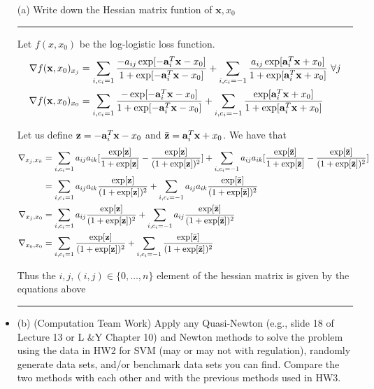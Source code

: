 \documentclass{article} %
\newcommand{\B}[1]{\mathbf{#1}}
\renewcommand\a{{\bf a}}
\newcommand\z{{\bf z}}
\newcommand\x{{\bf x}}
\renewcommand\a{{\bf a}}
\begin{document}
\begin{itemize}

\item[(a)]
Write down the Hessian matrix funtion of $\B{x}, x_0$


\rule{\textwidth}{1pt}

Let $f(x,x_0)$ be the log-logistic loss function. 
\begin{equation*}
\begin{aligned}
\nabla f(\x,x_0)_{x_j} &= \sum_{i,c_i = 1} \frac{-a_{ij} \exp[ -\a_i^T \x - x_0 ]}{ 1 + \exp[ -\a_i^T \x - x_0 ]} + \sum_{i, c_i = -1} \frac{a_{ij} \exp[ \a_i^T \x + x_0 ]}{ 1 + \exp[ \a_i^T \x + x_0 ]}  \mbox{  } \forall j \\
\nabla f(\x,x_0)_{x_0} &= \sum_{i,c_i = 1} \frac{- \exp[ -\a_i^T \x - x_0 ]}{ 1 + \exp[ -\a_i^T \x - x_0 ]} + \sum_{i, c_i = -1} \frac{ \exp[ \a_i^T \x + x_0 ]}{ 1 + \exp[ \a_i^T \x + x_0 ]} \\  
\end{aligned}
\end{equation*}


Let us define $\z = -\a_i^T \x - x_0 $ and $\bar{\z} =  \a_i^T \x + x_0$. We have that 
\begin{equation*}
\begin{aligned}
\nabla_{x_j, x_k} &= \sum_{i, c_i=1} a_{ij} a_{ik} [\frac{\exp[\z]}{ 1+ \exp[\z]}  - \frac{ \exp[\z]}{(1 + \exp[\z])^2}] + \sum_{i, c_i = -1} a_{ij} a_{ik} [\frac{\exp[\bar{\z}]}{ 1+ \exp[\bar{\z}]} - \frac{ \exp[\bar{\z}] }{(1 + \exp[\bar{\z}])^2}] \\ 
&= \sum_{i, c_i=1} a_{ij} a_{ik} \frac{\exp[\z]}{(1 + \exp[\z])^2} +  \sum_{i, c_i=-1} a_{ij} a_{ik} \frac{\exp[\bar{\z}]}{(1 + \exp[\bar{\z}])^2}\\ 
\nabla_{x_j, x_0} &= \sum_{i, c_i=1} a_{ij}  \frac{\exp[\z]}{(1 + \exp[\z])^2} +  \sum_{i, c_i=-1} a_{ij} \frac{\exp[\bar{\z}]}{(1 + \exp[\bar{\z}])^2} \\ 
\nabla_{x_0, x_0} &= \sum_{i, c_i=1} \frac{\exp[\z]}{(1 + \exp[\z])^2} +  \sum_{i, c_i=-1}  \frac{\exp[\bar{\z}]}{(1 + \exp[\bar{\z}])^2}
\end{aligned}
\end{equation*}

Thus the $i, j, (i,j) \in \{ 0, \hdots, n \}$ element of the hessian matrix is given by the equations above 
\\
\rule{\textwidth}{1pt}

\item (b) (Computation Team Work) Apply any Quasi-Newton (e.g., slide 18 of Lecture
13 or L $\&$Y Chapter 10) and Newton methods to solve the problem using the
data in HW2 for SVM (may or may not with regulation), randomly generate data
sets, and/or benchmark data sets you can find. Compare the two methods with
each other and with the previous methods used in HW3.
\end{itemize}
\end{document}
